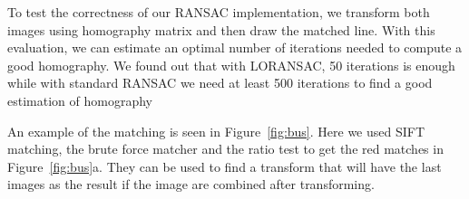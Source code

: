 To test the correctness of our RANSAC implementation, we transform both images using homography matrix and then draw the matched line.
With this evaluation, we can estimate an optimal number of iterations needed to compute a good homography.
We found out that with LORANSAC, 50 iterations is enough while with standard RANSAC we need at least 500 iterations to find a good estimation of homography 

An example of the matching is seen in Figure~\ref{fig:bus}. Here we used SIFT matching, the brute force matcher and the ratio test to get the red matches in Figure~\ref{fig:bus}a.  They can be used to find a transform that will have the last images as the result if the image are combined after transforming.
